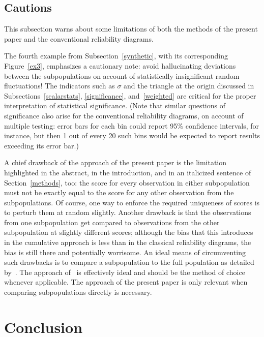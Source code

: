 \documentclass{article}
\begin{document}
\clearpage


\subsection{Cautions}
\label{caution}

This subsection warns about some limitations of both the methods
of the present paper and the conventional reliability diagrams.

The fourth example from Subsection~\ref{synthetic},
with its corresponding Figure~\ref{ex3}, emphasizes a cautionary note:
avoid hallucinating deviations between the subpopulations
on account of statistically insignificant random fluctuations!
The indicators such as $\sigma$ and the triangle at the origin
discussed in Subsections~\ref{scalarstats},
\ref{significance}, and~\ref{weighted} are critical
for the proper interpretation of statistical significance.
(Note that similar questions of significance also arise
for the conventional reliability diagrams, on account of multiple testing:
error bars for each bin could report 95\% confidence intervals, for instance,
but then 1 out of every 20 such bins would be expected to report results
exceeding its error bar.)

A chief drawback of the approach of the present paper
is the limitation highlighted in the abstract, in the introduction,
and in an italicized sentence of Section~\ref{methods}, too:
the score for every observation in either subpopulation
must not be exactly equal to the score for any other observation
from the subpopulations. Of course, one way to enforce the required uniqueness
of scores is to perturb them at random slightly.
Another drawback is that the observations
from one subpopulation get compared to observations
from the other subpopulation at slightly different scores;
although the bias that this introduces in the cumulative approach
is less than in the classical reliability diagrams, the bias is still there
and potentially worrisome.
An ideal means of circumventing such drawbacks is to compare
a subpopulation to the full population as detailed by~\cite{tygert}.
The approach of~\cite{tygert} is effectively ideal
and should be the method of choice whenever applicable.
The approach of the present paper is only relevant
when comparing subpopulations directly is necessary.



\section{Conclusion}
\label{conclusion}
\end{document}
